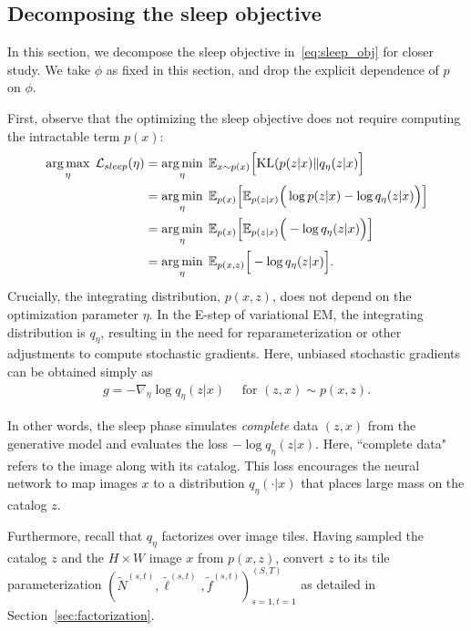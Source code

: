 \subsection{Decomposing the sleep objective}
\label{sec:sleep_details}
In this section, we decompose the sleep objective in~\eqref{eq:sleep_obj} for closer study. 
We take $\phi$ as fixed in this section, and drop the explicit dependence of $p$ on $\phi$.

First, observe that the optimizing the sleep objective does not require computing the intractable term $p(x)$:
\begin{align}
\operatorname*{arg\,max}_\eta\; \mathcal{L}_{sleep}(\eta)
    & = \operatorname*{arg\,min}_{\eta} \; \mathbb{E}_{x \sim p(x)}\Big[ \mathrm{KL}(p(z | x) \| q_\eta(z | x)\Big] \\
  &=\operatorname*{arg\,min}_{\eta} \; \mathbb E_{p(x)}\Big[\mathbb E_{p(z | x)}\Big(\log p(z | x) - \log q_\eta(z | x) \Big)\Big]\\
&=\operatorname*{arg\,min}_{\eta} \; \mathbb E_{p(x)}\Big[\mathbb E_{p(z | x)}\Big( - \log q_\eta(z | x) \Big)\Big]\\
&=\operatorname*{arg\,min}_{\eta} \; \mathbb E_{p(x, z)}\Big[- \log q_\eta(z | x) \Big]\label{eq:sleep_loss_simple}.
\end{align}
Crucially, the integrating distribution, $p(x,z)$, does not depend on the optimization parameter $\eta$.
In the E-step of variational EM, the integrating distribution is $q_\eta$, resulting in the need for reparameterization or other adjustments to compute stochastic gradients. 
Here, unbiased stochastic gradients can be obtained simply as 
\begin{align}
    g = -\nabla_\eta \log q_\eta(z | x) \quad \text{ for } (z, x)\sim p(x, z).
\end{align}

In other words, the sleep phase simulates {\itshape complete} data $(z, x)$ from the generative model and evaluates the loss $-\log q_\eta(z | x)$. 
Here, ``complete data" refers to the image along with its catalog. 
This loss encourages the neural network to map images $x$ to a distribution $q_{\eta}(\cdot | x)$ that places large mass on the catalog $z$.

Furthermore, recall that $q_\eta$ factorizes over image tiles. Having sampled the catalog $z$ 
and the $H\times W$ image $x$ from $p(x,z)$, convert $z$ to its tile parameterization $(\tilde N^{(s,t)}, \tilde \ell^{(s,t)}, \tilde f^{(s,t)})_{s=1,t=1}^{(S,T)}$ as detailed in Section~\ref{sec:factorization}.

